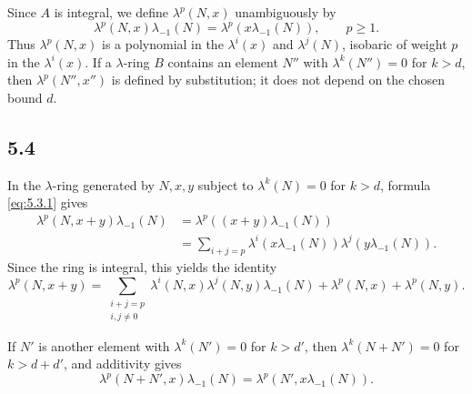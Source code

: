 \documentclass[13pt]{extarticle}
\begin{document}
Since $A$ is integral, we define $\lambda^p(N,x)$ unambiguously by
\begin{equation}\label{eq:5.3.1}
\lambda^p(N,x)\lambda_{-1}(N)=\lambda^p(x\lambda_{-1}(N)),
\qquad p\geq 1.
\end{equation}
Thus $\lambda^p(N,x)$ is a polynomial in the $\lambda^i(x)$ and $\lambda^j(N)$, isobaric of weight $p$ in the $\lambda^i(x)$. If a $\lambda$-ring $B$ contains an element $N''$ with $\lambda^k(N'')=0$ for $k>d$, then $\lambda^p(N'',x'')$ is defined by substitution; it does not depend on the chosen bound $d$.

\subsection*{5.4}
In the $\lambda$-ring generated by $N,x,y$ subject to $\lambda^k(N)=0$ for $k>d$, formula \eqref{eq:5.3.1} gives
\begin{align*}
\lambda^p(N,x+y)\lambda_{-1}(N)
&=\lambda^p((x+y)\lambda_{-1}(N))\\
&=\sum_{i+j=p}\lambda^i(x\lambda_{-1}(N))\lambda^j(y\lambda_{-1}(N)).
\end{align*}
Since the ring is integral, this yields the identity
\begin{equation}\label{eq:5.4.1}
\lambda^p(N,x+y)=\sum_{\substack{i+j=p\\ i,j\neq 0}}\lambda^i(N,x)\lambda^j(N,y)\lambda_{-1}(N)+\lambda^p(N,x)+\lambda^p(N,y).
\end{equation}

If $N'$ is another element with $\lambda^k(N')=0$ for $k>d'$, then $\lambda^k(N+N')=0$ for $k>d+d'$, and additivity gives
\begin{equation}\label{eq:5.4.2}
\lambda^p(N+N',x)\lambda_{-1}(N)=\lambda^p(N',x\lambda_{-1}(N)).
\end{equation}
\end{document}
